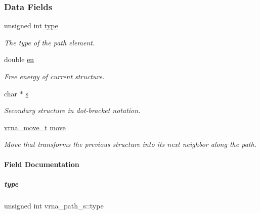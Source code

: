 \subsubsection*{Data Fields}
\begin{DoxyCompactItemize}
\item 
unsigned int \mbox{\hyperlink{group__paths_a5fc9e0a7dc0e0f8ad67f24c18f2dc852}{type}}
\begin{DoxyCompactList}\small\item\em The type of the path element. \end{DoxyCompactList}\item 
\mbox{\label{group__paths_ac25160bf31d28097358278f367e41227}} 
double \mbox{\hyperlink{group__paths_ac25160bf31d28097358278f367e41227}{en}}
\begin{DoxyCompactList}\small\item\em Free energy of current structure. \end{DoxyCompactList}\item 
\mbox{\label{group__paths_a141b70a59cb81d10bc65bbb7a0f6db77}} 
char $\ast$ \mbox{\hyperlink{group__paths_a141b70a59cb81d10bc65bbb7a0f6db77}{s}}
\begin{DoxyCompactList}\small\item\em Secondary structure in dot-\/bracket notation. \end{DoxyCompactList}\item 
\mbox{\label{group__paths_a13da6bb5167362199947765b06a84005}} 
\mbox{\hyperlink{group__neighbors_ga08630e00206cd163ea29c462bf5f4755}{vrna\+\_\+move\+\_\+t}} \mbox{\hyperlink{group__paths_a13da6bb5167362199947765b06a84005}{move}}
\begin{DoxyCompactList}\small\item\em Move that transforms the previous structure into it\textquotesingle{}s next neighbor along the path. \end{DoxyCompactList}\end{DoxyCompactItemize}


\paragraph{Field Documentation}
\mbox{\label{group__paths_a5fc9e0a7dc0e0f8ad67f24c18f2dc852}} 
\subparagraph{\texorpdfstring{type}{type}}
{\footnotesize\ttfamily unsigned int vrna\+\_\+path\+\_\+s\+::type}



